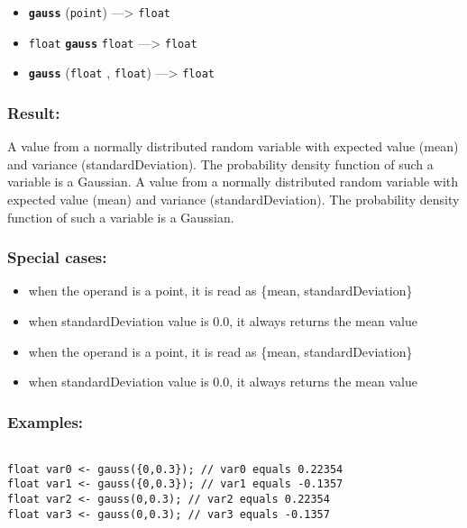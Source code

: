 \documentclass[]{book}
\providecommand{\tightlist}{%
  \setlength{\itemsep}{0pt}\setlength{\parskip}{0pt}}
\theoremstyle{definition}
\theoremstyle{definition}
\theoremstyle{definition}
\theoremstyle{remark}
\begin{document}
\begin{itemize}
\tightlist
\item
  \textbf{\texttt{gauss}} (\texttt{point}) ---\textgreater{}
  \texttt{float}
\item
  \texttt{float} \textbf{\texttt{gauss}} \texttt{float}
  ---\textgreater{} \texttt{float}
\item
  \textbf{\texttt{gauss}} (\texttt{float} , \texttt{float})
  ---\textgreater{} \texttt{float}
\end{itemize}

\subsubsection{Result:}\label{result-179}

A value from a normally distributed random variable with expected value
(mean) and variance (standardDeviation). The probability density
function of such a variable is a Gaussian. A value from a normally
distributed random variable with expected value (mean) and variance
(standardDeviation). The probability density function of such a variable
is a Gaussian.

\subsubsection{Special cases:}\label{special-cases-66}

\begin{itemize}
\tightlist
\item
  when the operand is a point, it is read as \{mean,
  standardDeviation\}\\
\item
  when standardDeviation value is 0.0, it always returns the mean
  value\\
\item
  when the operand is a point, it is read as \{mean,
  standardDeviation\}\\
\item
  when standardDeviation value is 0.0, it always returns the mean value
\end{itemize}

\subsubsection{Examples:}\label{examples-135}

\begin{verbatim}
 
float var0 <- gauss({0,0.3}); // var0 equals 0.22354 
float var1 <- gauss({0,0.3}); // var1 equals -0.1357 
float var2 <- gauss(0,0.3); // var2 equals 0.22354 
float var3 <- gauss(0,0.3); // var3 equals -0.1357
\end{verbatim}
\end{document}
